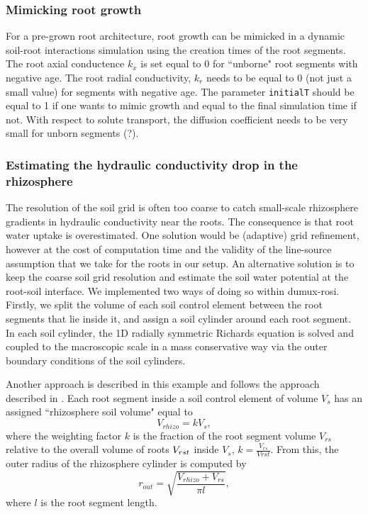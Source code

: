 \subsubsection*{Mimicking root growth}

For a pre-grown root architecture, root growth can be mimicked in a dynamic soil-root interactions simulation using the creation times of the root segments. The root axial conductence $k_x$ is set equal to 0 for ``unborne" root segments with negative age. The root radial conductivity, $k_r$ needs to be equal to 0 (not just a small value) for segments with negative  age. 
The parameter \lstinline{initialT} should be equal to 1 if one wants to mimic growth and equal to the final simulation time if not. 
With respect to solute transport, the diffusion coefficient needs to be very small  for unborn segments (?).



\subsubsection*{Estimating the hydraulic conductivity drop in the rhizosphere} \label{sec:hydro_rhizo}

The resolution of the soil grid is often too coarse to catch small-scale rhizosphere gradients in hydraulic conductivity near the roots. The consequence is that root water uptake is overestimated. One solution would be (adaptive) grid refinement, however at the cost of computation time and the validity of the line-source assumption that we take for the roots in our setup. 
An alternative solution is to keep the coarse soil grid resolution and estimate the soil water potential at the root-soil interface. We implemented two ways of doing so within dumux-rosi. Firstly, we split the volume of each soil control element between the root segments that lie inside it, and assign a soil cylinder around each root segment. In each soil cylinder, the 1D radially symmetric Richards equation is solved and coupled to the macroscopic scale in a mass conservative way via the outer boundary conditions of the soil cylinders. 

Another approach is described in this example and follows the approach described in \cite{Schroeder2008}. Each root segment inside a soil control element of volume $V_s$ has an assigned ``rhizosphere soil volume" equal to $$V_{rhizo} = k V_s,$$ where the weighting factor $k$ is the fraction of the root segment volume $V_{rs}$ relative to the overall volume of roots $V_{rst\textsc{}}$ inside $V_s$, $k=\frac{V_{rs}}{V{rst}}$. 
From this, the outer radius of the rhizosphere cylinder is computed by 
$$r_{out}=\sqrt{\frac{V_{rhizo}+V_{rs}}{\pi l}},$$ where $l$ is the root segment length. 


